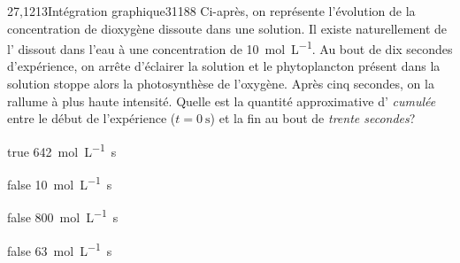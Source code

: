 \documentclass[11pt]{article}
\begin{document}
        \begin{question}{27,1213}{Intégration graphique}{3}{1188}
             Ci-après, on représente l'évolution de la concentration de dioxygène dissoute dans une solution. Il existe naturellement de l' dissout dans l'eau à une concentration de \SI{10}{\mol\per\liter}. Au bout de dix secondes d'expérience, on arrête d'éclairer la solution et le phytoplancton présent dans la solution stoppe alors la photosynthèse de l'oxygène. Après cinq secondes, on la rallume à plus haute intensité. Quelle est la quantité approximative d' \emph{cumulée} entre le début de l'expérience ($t=\SI{0}{\second}$) et la fin au bout de \emph{trente secondes}?
            \begin{figure}
             \end{figure}
        \end{question}
        \begin{reponses}
		    \item[true] \SI{642}{\mol\per\liter.\second}
		    \item[false] \SI{10}{\mol\per\liter.\second}
		    \item[false] \SI{800}{\mol\per\liter.\second}
		    \item[false] \SI{63}{\mol\per\liter.\second}
	    \end{reponses}
		
\end{document}
